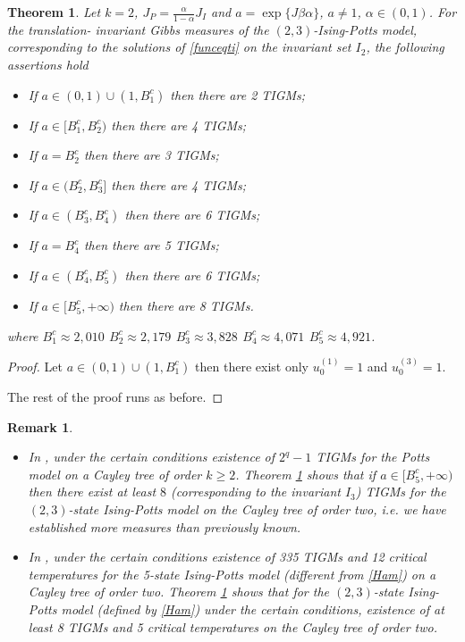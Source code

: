 \documentclass[sn-mathphys]{sn-jnl}%
\theoremstyle{thmstyleone}%
\newtheorem{theorem}{Theorem}%
\theoremstyle{thmstyletwo}%
\newtheorem{remark}{Remark}%
\theoremstyle{thmstylethree}%
\begin{document}
\begin{theorem}\label{k2ti3}
Let $k=2$, $J_P=\frac{\alpha}{1-\alpha}J_I$ and $a=\exp\{J\beta\alpha\}$,  $a\neq1$, $\alpha\in(0,1)$. For the translation- invariant Gibbs measures of the $(2,3)$-Ising-Potts model, corresponding to the solutions of \eqref{funceqti} on the invariant set $I_2$, the following assertions hold
\begin{itemize}
  \item If $a\in (0,1)\cup (1, B^c_1)$ then there are 2 TIGMs;
  \item If $a\in [B^c_1,B^c_2)$ then there are 4 TIGMs;
  \item If $a=B^c_2$ then there are 3 TIGMs;
  \item If $a\in (B^c_2,B^c_3]$ then there are 4 TIGMs;
  \item If $a\in (B^c_3,B^c_4)$ then there are 6 TIGMs;
  \item If $a=B^c_4$ then there are 5 TIGMs;
  \item If $a\in (B^c_4,B^c_5)$ then there are 6 TIGMs;
  \item If $a\in [B^c_5,+\infty)$ then there are 8 TIGMs.
\end{itemize}
where $B^c_1\approx2,010\, \ B^c_2\approx2,179\, \ B^c_3\approx3,828\, \ B^c_4\approx4,071\, \ B^c_5\approx4,921 $.
\end{theorem}
\begin{proof} Let $a\in (0,1)\cup (1, B^c_1)$ then there exist only $u_0^{(1)}=1$ and $u_0^{(3)}=1$.

The rest of the proof runs as before.
\end{proof}
\begin{remark}\label{comp}
\begin{itemize}
  \item In \cite{KRH14}, under the certain conditions existence of $2^q-1$ TIGMs for the Potts model on a Cayley tree of order $k\geq2$. Theorem \ref{k2ti3} shows that if $a\in [B^c_5,+\infty)$  then there exist at least $8$ (corresponding to the invariant $I_3$) TIGMs for the $(2,3)$-state Ising-Potts model on the Cayley tree of order two, i.e. we have established more measures than previously known.
  \item In \cite{HOR25}, under the certain conditions existence of 335 TIGMs and 12 critical temperatures for the 5-state Ising-Potts model (different from \eqref{Ham}) on a Cayley tree of order two. Theorem \ref{k2ti3} shows that for the $(2,3)$-state Ising-Potts model (defined by \eqref{Ham}) under the certain conditions, existence of at least 8 TIGMs and 5 critical temperatures  on the Cayley tree of order two.
  \end{itemize}
\end{remark}
\end{document}
